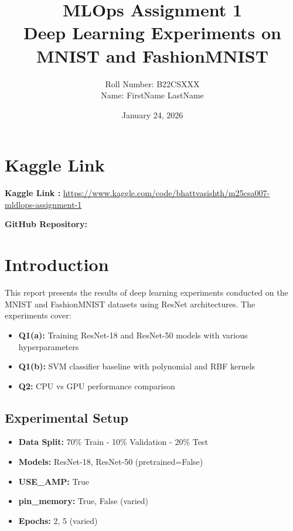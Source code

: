 \documentclass[11pt,a4paper]{article}
\title{\textbf{MLOps Assignment 1}\\[0.5em]
\large Deep Learning Experiments on MNIST and FashionMNIST}
\author{Roll Number: B22CSXXX \\ Name: FirstName LastName}
\date{January 24, 2026}
\begin{document}
\maketitle

\section*{Kaggle Link}
\textbf{Kaggle Link :} \url{https://www.kaggle.com/code/bhattvasishth/m25csa007-mldlops-assignment-1}

\vspace{0.5cm}
\textbf{GitHub Repository:} \url{}

\tableofcontents
\newpage

\section{Introduction}

This report presents the results of deep learning experiments conducted on the MNIST and FashionMNIST datasets using ResNet architectures. The experiments cover:

\begin{itemize}
    \item \textbf{Q1(a):} Training ResNet-18 and ResNet-50 models with various hyperparameters
    \item \textbf{Q1(b):} SVM classifier baseline with polynomial and RBF kernels
    \item \textbf{Q2:} CPU vs GPU performance comparison
\end{itemize}

\subsection{Experimental Setup}
\begin{itemize}
    \item \textbf{Data Split:} 70\% Train - 10\% Validation - 20\% Test
    \item \textbf{Models:} ResNet-18, ResNet-50 (pretrained=False)
    \item \textbf{USE\_AMP:} True
    \item \textbf{pin\_memory:} True, False (varied)
    \item \textbf{Epochs:} 2, 5 (varied)
\end{itemize}
\end{document}
